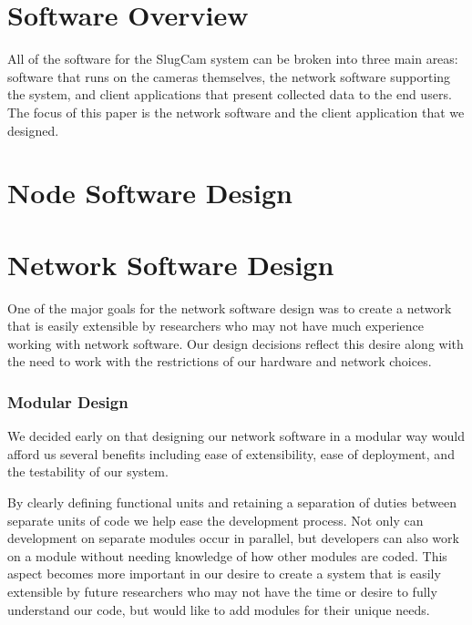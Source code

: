 %
\section{Software Overview}

All of the software for the SlugCam system can be broken into three main areas:
software that runs on the cameras themselves, the network software supporting
the system, and client applications that present collected data to the end
users. The focus of this paper is the network software and the client
application that we designed.

\section{Node Software Design}



\section{Network Software Design}

One of the major goals for the network software design was to create a
network that is easily extensible by researchers who may not have much
experience working with network software. Our design decisions reflect this
desire along with the need to work with the restrictions of our hardware and
network choices.

\subsubsection{Modular Design}

We decided early on that designing our network software in a modular way would
afford us several benefits including ease of extensibility, ease of deployment,
and the testability of our system.

By clearly defining functional units and retaining a separation of duties
between separate units of code we help ease the development process. Not only
can development on separate modules occur in parallel, but developers can also
work on a module without needing knowledge of how other modules are coded. This
aspect becomes more important in our desire to create a system that is easily
extensible by future researchers who may not have the time or desire to fully
understand our code, but would like to add modules for their unique needs.

